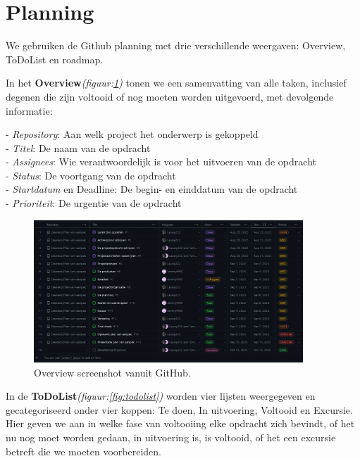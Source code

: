 \section{Planning} \label{planning}
We gebruiken de Github planning met drie verschillende weergaven: Overview, ToDoList en roadmap.

In het \textbf{Overview}\textit{(figuur:\ref{fig:overview})} tonen we een samenvatting van alle taken, inclusief degenen die zijn voltooid of nog moeten worden uitgevoerd, met devolgende informatie:

- \textit{Repository}: Aan welk project het onderwerp is gekoppeld\\
- \textit{Titel}: De naam van de opdracht\\
- \textit{Assignees}: Wie verantwoordelijk is voor het uitvoeren van de opdracht\\
- \textit{Status}: De voortgang van de opdracht\\
- \textit{Startdatum} en Deadline: De begin- en einddatum van de opdracht\\
- \textit{Prioriteit}: De urgentie van de opdracht\\

\begin{figure}[h]
    \centering
    \includegraphics[width=0.9\textwidth]{IMG/overview.PNG}
    \caption{Overview screenshot vanuit GitHub.}
    \label{fig:overview}
\end{figure}

\newpage
In de \textbf{ToDoList}\textit{(figuur:\ref{fig:todolist})} worden vier lijsten weergegeven en gecategoriseerd onder vier koppen: Te doen, In uitvoering, Voltooid en Excursie. Hier geven we aan in welke fase van voltooiing elke opdracht zich bevindt, of het nu nog moet worden gedaan, in uitvoering is, is voltooid, of het een excursie betreft die we moeten voorbereiden.

